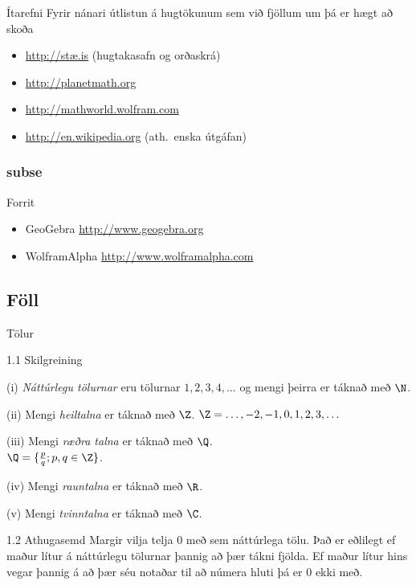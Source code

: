 \documentclass[icelandic,a4paper,12pt]{article}
\begin{document}
\begin{frame}{Ítarefni}
 Fyrir nánari útlistun á hugtökunum sem við fjöllum um þá er hægt að skoða
\begin{itemize}
 \item \href{http://stae.is}{http://stæ.is} (hugtakasafn og orðaskrá)
  \item \href{http://planetmath.org}{http://planetmath.org}
  \item \href{http://mathworld.wolfram.com}{http://mathworld.wolfram.com}
  \item \href{http://en.wikipedia.org}{http://en.wikipedia.org} (ath.~enska útgáfan)
\end{itemize}

\pause
\subsubsection*{subse}
\begin{block}{Forrit}
 \begin{itemize}
  \item GeoGebra \href{http://www.geogebra.org}{http://www.geogebra.org}
  \item WolframAlpha \href{http://www.wolframalpha.com}{http://www.wolframalpha.com}
 \end{itemize}

\end{block}


\end{frame}

\subsection*{Föll}	

\begin{frame}{Tölur}

\begin{block}{1.1 Skilgreining}

(i)  \emph{Náttúrlegu tölurnar} eru tölurnar
$1, 2, 3, 4, \ldots$ og mengi þeirra er táknað með $\N$.   \pause

(ii)  Mengi \emph{heiltalna} er táknað með $\Z$. $\Z = \ldots,-2,-1,0,1,2,3,\ldots$\pause

(iii) Mengi \emph{ræðra talna} er táknað með $\Q$. \\$\Q = \{ \frac pq ; p,q \in \Z \}$.\pause

(iv)  Mengi \emph{rauntalna} er táknað með $\R$.\pause

(v)   Mengi \emph{tvinntalna} er táknað með $\C$.
\end{block}

\pause

\begin{block}{1.2 Athugasemd}  
Margir vilja telja $0$ með sem náttúrlega tölu.  Það er eðlilegt ef 
maður lítur á náttúrlegu tölurnar þannig að þær tákni fjölda.  Ef maður lítur hins vegar þannig
á að þær séu notaðar til að númera hluti
þá er 0 ekki með.
\end{block}

\end{frame}
\end{document}
